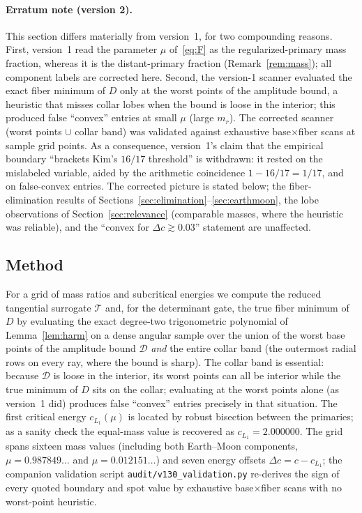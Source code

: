 \documentclass[11pt,reqno]{amsart}
\theoremstyle{plain}
\theoremstyle{definition}
\newcommand{\calT}{\mathcal{T}}
\newcommand{\calD}{\mathcal{D}}
\begin{document}
\paragraph{Erratum note (version 2).} This section differs materially from version~1, for two compounding reasons. First, version~1 read the parameter $\mu$ of~\eqref{eq:F} as the regularized-primary mass fraction, whereas it is the distant-primary fraction (Remark~\ref{rem:mass}); all component labels are corrected here. Second, the version-1 scanner evaluated the exact fiber minimum of $D$ only at the worst points of the amplitude bound, a heuristic that misses collar lobes when the bound is loose in the interior; this produced false ``convex'' entries at small $\mu$ (large $m_r$). The corrected scanner (worst points $\cup$ collar band) was validated against exhaustive base$\times$fiber scans at sample grid points. As a consequence, version~1's claim that the empirical boundary ``brackets Kim's $16/17$ threshold'' is withdrawn: it rested on the mislabeled variable, aided by the arithmetic coincidence $1-16/17=1/17$, and on false-convex entries. The corrected picture is stated below; the fiber-elimination results of Sections~\ref{sec:elimination}--\ref{sec:earthmoon}, the lobe observations of Section~\ref{sec:relevance} (comparable masses, where the heuristic was reliable), and the ``convex for $\Delta c\gtrsim 0.03$'' statement are unaffected.

\subsection{Method}
For a grid of mass ratios and subcritical energies we compute the reduced tangential surrogate $\calT$ and, for the determinant gate, the true fiber minimum of $D$ by evaluating the exact degree-two trigonometric polynomial of Lemma~\ref{lem:harm} on a dense angular sample over the union of the worst base points of the amplitude bound $\calD$ \emph{and} the entire collar band (the outermost radial rows on every ray, where the bound is sharp). The collar band is essential: because $\calD$ is loose in the interior, its worst points can all be interior while the true minimum of $D$ sits on the collar; evaluating at the worst points alone (as version~1 did) produces false ``convex'' entries precisely in that situation. The first critical energy $c_{L_1}(\mu)$ is located by robust bisection between the primaries; as a sanity check the equal-mass value is recovered as $c_{L_1}=2.000000$. The grid spans sixteen mass values (including both Earth--Moon components, $\mu=0.987849\ldots$ and $\mu=0.012151\ldots$) and seven energy offsets $\Delta c=c-c_{L_1}$; the companion validation script \texttt{audit/v130\_validation.py} re-derives the sign of every quoted boundary and spot value by exhaustive base$\times$fiber scans with no worst-point heuristic.
\end{document}
